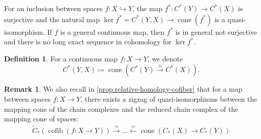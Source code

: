 \documentclass{scrartcl}
\theoremstyle{plain}
\theoremstyle{definition}
\newtheorem{definition}[theorem]{Definition}
\newtheorem{remark}[theorem]{Remark}
\DeclareMathOperator{\cone}{cone}
\DeclareMathOperator{\cofib}{cofib}
\newcommand{\quiso}{\simeq}
\newcommand{\defeq}{\coloneqq}
\let\xto\xrightarrow
\let\xfrom\xleftarrow
\newcommand{\injto}{\hookrightarrow}
\begin{document}
    For an inclusion between spaces $f\colon X\injto Y$, the map $f^*\colon C^*(Y)\to C^*(X)$ is surjective and the natural map $\ker f^* = C^*(Y, X)\to \cone(f^*)$ is a quasi-isomorphism. If $f$ is a general continuous map, then $f^*$ is in general not surjective and there is no long exact sequence in cohomology for $\ker f^*$.
    \begin{definition}\label{notation:relative-mapping-cone}
        For a continuous map $f\colon X\to Y$, we denote $$C^*(Y, X) \defeq \cone(C^*(Y)\xto{\quiso} C^*(X)).$$
    \end{definition} 

\begin{remark}\label{rmk:cofib-cone}
    We also recall in \cref{prop:relative-homology-cofiber} that for a map between spaces $f\colon X\to Y$, there exists a zigzag of quasi-isomorphisms between the mapping cone of the chain complexes and the reduced chain complex of the mapping cone of spaces:
    \begin{align*}
        \tilde C_*(\cofib(f\colon X\to Y))\xto{\quiso} \dots\xfrom{\quiso} \cone(C_*(X)\to C_*(Y))
    \end{align*}
\end{remark}
\end{document}
